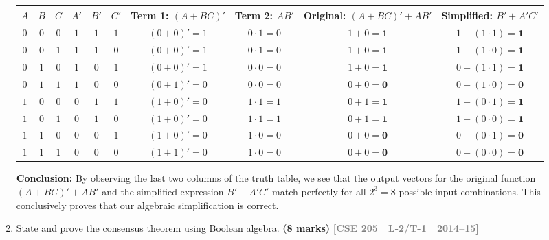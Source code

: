 \documentclass[12pt,a3paper]{article}
\newcommand{\yr}[1]{\hfill\textcolor{gray}{\small\textbf{[#1]}}}
\newcommand{\mk}[1]{\textcolor{orange!70!black}{\small\textbf{(#1 marks)}}}
\begin{document}
\begin{enumerate}
\begin{tcolorbox}[enhanced,breakable,ansbox,colback=cA!4,colframe=cA,boxrule=0.8pt,arc=5pt,title={\textbf{Answer}},fonttitle=\bfseries\color{white},colbacktitle=cA]
\begin{center}
\renewcommand{\arraystretch}{1.3}
\begin{tabular}{|c|c|c||c|c|c|c|c||c||c|}
\hline
\textbf{$A$} & \textbf{$B$} & \textbf{$C$} & \textbf{$A'$} & \textbf{$B'$} & \textbf{$C'$} & \textbf{Term 1:} $(A+BC)'$ & \textbf{Term 2:} $AB'$ & \textbf{Original:} $(A+BC)'+AB'$ & \textbf{Simplified:} $B'+A'C'$ \\
\hline
$0$ & $0$ & $0$ & $1$ & $1$ & $1$ & $(0+0)' = 1$ & $0 \cdot 1 = 0$ & $1 + 0 = \textbf{1}$ & $1 + (1\cdot 1) = \textbf{1}$ \\
\hline
$0$ & $0$ & $1$ & $1$ & $1$ & $0$ & $(0+0)' = 1$ & $0 \cdot 1 = 0$ & $1 + 0 = \textbf{1}$ & $1 + (1\cdot 0) = \textbf{1}$ \\
\hline
$0$ & $1$ & $0$ & $1$ & $0$ & $1$ & $(0+0)' = 1$ & $0 \cdot 0 = 0$ & $1 + 0 = \textbf{1}$ & $0 + (1\cdot 1) = \textbf{1}$ \\
\hline
$0$ & $1$ & $1$ & $1$ & $0$ & $0$ & $(0+1)' = 0$ & $0 \cdot 0 = 0$ & $0 + 0 = \textbf{0}$ & $0 + (1\cdot 0) = \textbf{0}$ \\
\hline
$1$ & $0$ & $0$ & $0$ & $1$ & $1$ & $(1+0)' = 0$ & $1 \cdot 1 = 1$ & $0 + 1 = \textbf{1}$ & $1 + (0\cdot 1) = \textbf{1}$ \\
\hline
$1$ & $0$ & $1$ & $0$ & $1$ & $0$ & $(1+0)' = 0$ & $1 \cdot 1 = 1$ & $0 + 1 = \textbf{1}$ & $1 + (0\cdot 0) = \textbf{1}$ \\
\hline
$1$ & $1$ & $0$ & $0$ & $0$ & $1$ & $(1+0)' = 0$ & $1 \cdot 0 = 0$ & $0 + 0 = \textbf{0}$ & $0 + (0\cdot 1) = \textbf{0}$ \\
\hline
$1$ & $1$ & $1$ & $0$ & $0$ & $0$ & $(1+1)' = 0$ & $1 \cdot 0 = 0$ & $0 + 0 = \textbf{0}$ & $0 + (0\cdot 0) = \textbf{0}$ \\
\hline
\end{tabular}
\end{center}

\vspace{0.2cm}
\textbf{Conclusion:} 
By observing the last two columns of the truth table, we see that the output vectors for the original function $(A+BC)'+AB'$ and the simplified expression $B'+A'C'$ match perfectly for all $2^3 = 8$ possible input combinations. This conclusively proves that our algebraic simplification is correct.

\end{tcolorbox}

\item State and prove the consensus theorem using Boolean algebra.
\mk{8} \yr{CSE 205 | L-2/T-1 | 2014--15}


\end{enumerate}
\end{document}
